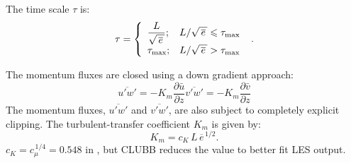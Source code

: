 \documentclass[11pt,fleqn]{article}
\newcommand{\ptlder}[2]{\frac{\partial #1}{\partial #2}}
\begin{document}

The time scale $\tau$ is:
%
\begin{equation}
\label{eq_tau}
\tau = \left\{
\begin{array}{ll}
\displaystyle \frac{L}{\sqrt{\, \overline{e} \,}}; 
& L / \sqrt{\, \overline{e} \,} \leqslant \tau_{\rm max} \\
\displaystyle \tau_{\rm max};
&  L / \sqrt{\, \overline{e} \,} > \tau_{\rm max}
\end{array}
\right. \hbox{ .}
\end{equation}
%

The momentum fluxes are closed using a down gradient approach:
%
\begin{subequations}
\begin{equation}
\label{eq_upwp}
\overline{u'w'} = -K_m \ptlder{\bar{u}}{z}
\end{equation}
%
\begin{equation}
\label{eq_vpwp}
\overline{v'w'} = -K_m \ptlder{\bar{v}}{z}
\end{equation}
\end{subequations}
%
The momentum fluxes, $\overline{u'w'}$ and $\overline{v'w'}$, are also subject 
to completely explicit clipping.  The turbulent-transfer coefficient $K_m$ is 
given by:
%
\begin{equation}
\label{eq_Km}
K_m = c_K \, L \, \overline{e}^{\, 1/2} .
\end{equation}
%
$c_K = c_{\mu}^{\, 1/4} = 0.548$ in \citet{duynkerke1987a}, but CLUBB reduces the value to better fit LES output.

\end{document}
